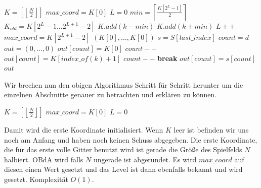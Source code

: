 \documentclass[a4paper,12pt]{llncs}
\numberwithin{equation}{section}
\begin{document}
\begin{tcolorbox}
	\begin{algorithmic}
		\State $K=\left[\left\lfloor\frac{N}{2}\right\rfloor\right]$
		\State $max\_coord=K\left[0\right]$
		\State $L=0$
		\EndIf
		\State $min=\left\lceil\frac{K[2^L-1]}{2}\right\rceil$
		\State $K_{old}=K\left[2^L-1\dots 2^{L+1}-2\right]$
		\State $K.add(k-min)$
		\State $K.add(k+min)$
		\EndFor
		\State $L++$
		\State $max\_coord=K\left[2^{L+1}-2\right]$
		\EndIf
		\State \Return $(K[0],\dots,K[0])$
		\Else
		\State $s=S[last\_index]$
		\State $count =d$
		\State $out=(0,\dots,0)$
		\State $out[count]=K[0]$
		\State $count--$
		\Else
		\State $out[count]=K[index\_of(k)+1]$
		\State $count--$
		\State \textbf{break}
		\EndIf
		\EndFor
		\State $out[count]=s[count]$
		\EndFor
		\State\Return $out$
		\EndIf
		\EndWhile
		\EndIf
		\EndFunction
	\end{algorithmic}
\end{tcolorbox}

Wir brechen nun den obigen Algorithmus Schritt für Schritt herunter um die einzelnen Abschnitte genauer zu betrachten und erklären zu können.

\begin{tcolorbox}
	\begin{algorithmic}
		\If{$K=\emptyset$}
		\State $K=\left[\left\lfloor\frac{N}{2}\right\rfloor\right]$
		\State $max\_coord=K\left[0\right]$
		\State $L=0$
		\EndIf
	\end{algorithmic}
\end{tcolorbox}

Damit wird die erste Koordinate initialisiert. Wenn $K$ leer ist befinden wir uns noch am Anfang und haben noch keinen Schuss abgegeben. Die erste Koordinate, die für das erste volle Gitter benutzt wird ist gerade die Größe des Spielfelds $N$ halbiert. OBdA wird falls $N$ ungerade ist abgerundet. Es wird $max\_coord$ auf diesen einen Wert gesetzt und das Level ist dann ebenfalls bekannt und wird gesetzt. Komplexität $O(1)$.
\end{document}
